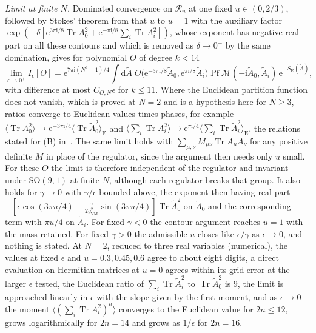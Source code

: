 \emph{Limit at finite \(N\).} Dominated convergence on \(\mathcal R_u\) at one fixed \(u\in(0,2/3)\), followed by Stokes' theorem from that \(u\) to \(u=1\) with the auxiliary factor \(\exp(-\delta[\mathrm e^{3\pi\mathrm i/8}\operatorname{Tr}A_0^2+\mathrm e^{-\pi\mathrm i/8}\sum_i\operatorname{Tr}A_i^2])\), whose exponent has negative real part on all these contours and which is removed as \(\delta\to0^+\) by the same domination, gives for polynomial \(O\) of degree \(k<14\)
\[
\lim_{\epsilon\to0^+}I_\epsilon[O]=\mathrm e^{7\pi\mathrm i(N^2-1)/4}\int\mathrm d\tilde A\;O\bigl(\mathrm e^{-3\pi\mathrm i/8}\tilde A_0,\mathrm e^{\pi\mathrm i/8}\tilde A_i\bigr)\operatorname{Pf}\mathcal M(-\mathrm i\tilde A_0,\tilde A_i)\,\mathrm e^{-S_{\mathrm E}(\tilde A)},
\]
with difference at most \(C_{O,N}\epsilon\) for \(k\le11\). Where the Euclidean partition function does not vanish, which is proved at \(N=2\) and is a hypothesis here for \(N\ge3\), ratios converge to Euclidean values times phases, for example \(\langle\operatorname{Tr}A_0^2\rangle\to\mathrm e^{-3\pi\mathrm i/4}\langle\operatorname{Tr}\tilde A_0^2\rangle_{\mathrm E}\) and \(\langle\sum_i\operatorname{Tr}A_i^2\rangle\to\mathrm e^{\pi\mathrm i/4}\langle\sum_i\operatorname{Tr}\tilde A_i^2\rangle_{\mathrm E}\), the relations stated for (B) in~\cite{Anagnostopoulos2026}. The same limit holds with \(\sum_{\mu,\nu}M_{\mu\nu}\operatorname{Tr}A_\mu A_\nu\) for any positive definite \(M\) in place of the regulator, since the argument then needs only \(u\) small. For these \(O\) the limit is therefore independent of the regulator and invariant under \(\mathrm{SO}(9,1)\) at finite \(N\), although each regulator breaks that group. It also holds for \(\gamma\to0\) with \(\gamma/\epsilon\) bounded above, the exponent then having real part \(-[\epsilon\cos(3\pi u/4)-\tfrac{\gamma}{2g_{\mathrm{YM}}^2}\sin(3\pi u/4)]\operatorname{Tr}\tilde A_0^2\) on \(\tilde A_0\) and the corresponding term with \(\pi u/4\) on \(\tilde A_i\). For fixed \(\gamma<0\) the contour argument reaches \(u=1\) with the mass retained. For fixed \(\gamma>0\) the admissible \(u\) closes like \(\epsilon/\gamma\) as \(\epsilon\to0\), and nothing is stated. At \(N=2\), reduced to three real variables (numerical), the values at fixed \(\epsilon\) and \(u=0.3,0.45,0.6\) agree to about eight digits, a direct evaluation on Hermitian matrices at \(u=0\) agrees within its grid error at the larger \(\epsilon\) tested, the Euclidean ratio of \(\sum_i\operatorname{Tr}\tilde A_i^2\) to \(\operatorname{Tr}\tilde A_0^2\) is \(9\), the limit is approached linearly in \(\epsilon\) with the slope given by the first moment, and as \(\epsilon\to0\) the moment \(\langle(\sum_i\operatorname{Tr}A_i^2)^{n}\rangle\) converges to the Euclidean value for \(2n\le12\), grows logarithmically for \(2n=14\) and grows as \(1/\epsilon\) for \(2n=16\).

